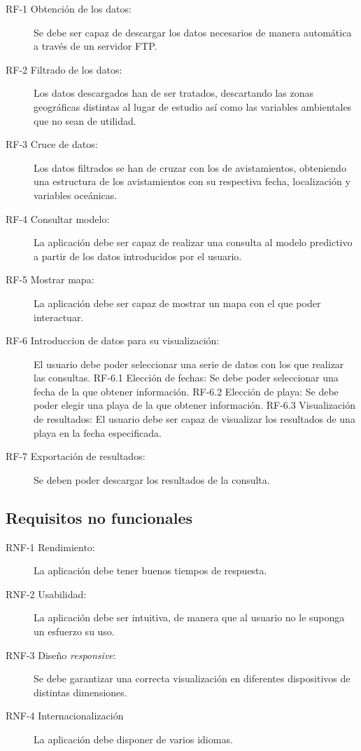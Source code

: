 \begin{description}
	\item[RF-1 Obtención de los datos:] Se debe ser capaz de descargar los datos necesarios de manera automática a través de un servidor FTP.
	\item[RF-2 Filtrado de los datos:] Los datos descargados han de ser tratados, descartando las zonas geográficas distintas al lugar de estudio así como las variables ambientales que no sean de utilidad.
	\item[RF-3 Cruce de datos:] Los datos filtrados se han de cruzar con los de avistamientos, obteniendo una estructura de los avistamientos con su respectiva fecha, localización y variables oceánicas.	
	\item[RF-4 Consultar modelo:] La aplicación debe ser capaz de realizar una consulta al modelo predictivo a partir de los datos introducidos por el usuario.
	\item[RF-5 Mostrar mapa:] La aplicación debe ser capaz de mostrar un mapa con el que poder interactuar.
	\item[RF-6 Introduccion de datos para su visualización:] El usuario debe poder seleccionar una serie de datos con los que realizar las consultas.
	\subitem RF-6.1 Elección de fechas: Se debe poder seleccionar una fecha de la que obtener información.
	\subitem RF-6.2 Elección de playa: Se debe poder elegir una playa de la que obtener información.
	\subitem RF-6.3 Visualización de resultados: El usuario debe ser capaz de visualizar los resultados de una playa en la fecha especificada.	
	\item[RF-7 Exportación de resultados:] Se deben poder descargar los resultados de la consulta.
\end{description}

	\subsection{Requisitos no funcionales}

\begin{description}
	\item[RNF-1 Rendimiento:] La aplicación debe tener buenos tiempos de respuesta.
	\item[RNF-2 Usabilidad:] La aplicación debe ser intuitiva, de manera que al usuario no le suponga un esfuerzo su uso.
	\item[RNF-3 Diseño \emph{responsive}:] Se debe garantizar una correcta visualización en diferentes dispositivos de distintas dimensiones.
	\item[RNF-4 Internacionalización] La aplicación debe disponer de varios idiomas.
\end{description}


